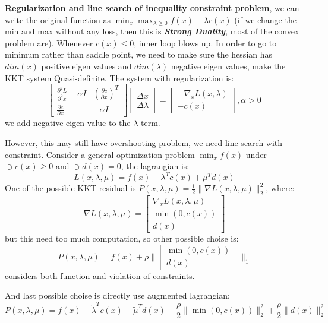 \documentclass[10pt]{elegantbook}
\newcommand{\mydefination}[1]{\textbf{\textit{\textcolor{structurecolor}{#1}}}}
\begin{document}
\textbf{Regularization and line search of inequality constraint problem}, we can write the original function as 
$\min_x \max_{\lambda \geq 0}f(x) - \lambda c(x)$ (if we change the min and max without any loss, then this is
\mydefination{Strong Duality}, most of the convex problem are). Whenever $c(x) \leq 0$, inner loop blows up. In order to go to
minimum rather than saddle point, we need to make sure the hessian has $dim(x)$ positive eigen values and $dim(\lambda)$
negative eigen values, make the KKT system Quasi-definite. The system with regularization is:
\begin{equation}
\begin{bmatrix}
    \frac{\partial^2 L}{\partial^2 x} + \alpha I & (\frac{\partial c}{\partial x})^T \\
    \frac{\partial c}{\partial x} & -\alpha I
\end{bmatrix}
\begin{bmatrix}
    \Delta x \\
    \Delta \lambda
\end{bmatrix}
=
\begin{bmatrix}
    -\nabla_x L(x, \lambda) \\
    -c(x)
\end{bmatrix}, \alpha > 0
\end{equation}
we add negative eigen value to the $\lambda$ term.

However, this may still have overshooting problem, we need line search with constraint. Consider a general
optimization problem $\min_x f(x)$ under $\ni c(x) \geq 0$ and $\ni d(x) = 0$, the lagrangian is:
\[ L(x, \lambda, \mu) = f(x) - \lambda^Tc(x) + \mu^Td(x) \]
One of the possible KKT residual is $P(x, \lambda, \mu) = \frac{1}{2} \| \nabla L(x, \lambda, \mu) \|_2^2$, where:
\[ \nabla L(x, \lambda, \mu) = \begin{bmatrix}
    \nabla_x L(x, \lambda, \mu) \\
    \min(0, c(x)) \\
    d(x)
\end{bmatrix} \]
but this need too much computation, so other possible choise is:
\[ P(x, \lambda, \mu) = f(x) + \rho \| \begin{bmatrix}
    \min(0, c(x)) \\
    d(x)
\end{bmatrix} \|_1 \]
considers both function and violation of constraints.

And last possible choise is directly use augmented lagrangian:
\[ P(x, \lambda, \mu) = f(x) - \tilde{\lambda}^T c(x) + \tilde{\mu}^Td(x) + \frac{\rho}{2} \| \min(0, c(x)) \|_2^2
+\frac{\rho}{2} \| d(x) \|_2^2
\]
\end{document}
